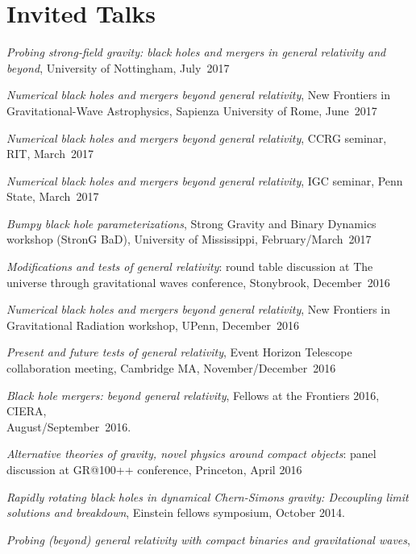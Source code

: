 \newcommand{\playsymbol}{$\blacktriangleright$}
\section{\sc Invited Talks}
\begin{etaremune}
\item
  {\it Probing strong-field gravity: black holes and mergers in
    general relativity and beyond},
  University of Nottingham, July~2017
\item
  {\it Numerical black holes and mergers beyond general relativity},
  New Frontiers in Gravitational-Wave Astrophysics,
  Sapienza University of Rome, June~2017
\item
  {\it Numerical black holes and mergers beyond general
    relativity}, CCRG seminar, RIT, March~2017
\item
  {\it Numerical black holes and mergers beyond general
    relativity}, IGC seminar, Penn State, March~2017
\item
  {\it Bumpy black hole parameterizations}, Strong Gravity
  and Binary Dynamics workshop (StronG BaD), University of
  Mississippi, February/March~2017
\item
  {\it Modifications and tests of general relativity}:
  round table discussion at
  The universe through gravitational waves conference,
  Stonybrook, December~2016
\item
  {\it Numerical black holes and mergers beyond general relativity},
  New Frontiers in Gravitational Radiation workshop, UPenn, December~2016
\item
  {\it Present and future tests of general relativity},
  Event Horizon Telescope collaboration meeting, Cambridge MA,
  November/December~2016
\item
  {\it Black hole mergers: beyond general relativity},
  Fellows at the Frontiers 2016, CIERA,\\ August/September~2016.
\item
  {\it Alternative theories of gravity, novel physics
    around compact objects}: panel discussion at GR@100++ conference,
  Princeton, April 2016
\item
  {\it Rapidly rotating black holes in dynamical Chern-Simons gravity:
    Decoupling limit solutions and breakdown},
  Einstein fellows symposium, October 2014.
\item
  {\it Probing (beyond) general relativity with compact binaries and
    gravitational waves},

\end{etaremune}
